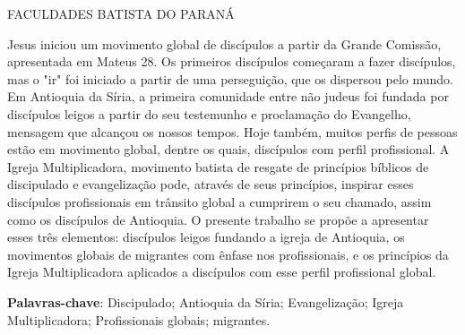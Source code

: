 \documentclass[12pt,openright,oneside,a4paper,
english,french,spanish,brazil]{abntex2}
\renewcommand{\imprimircapa}{%
  \begin{capa}%
    \center
    \ABNTEXchapterfont\Large FACULDADES BATISTA DO PARANÁ

    \vspace*{1,5cm}
    \MakeUppercase{{\ABNTEXchapterfont\large\imprimirautor}}
    \vfill
    \begin{center}
	\MakeUppercase{\ABNTEXchapterfont\bfseries\large\imprimirtitulo}
    \end{center}
    \vfill
    \large\imprimirlocal

    \large\imprimirdata
    \vspace*{1cm}
  \end{capa}
}
\begin{document}
 

\imprimircapa 
\imprimirfolhaderosto 

\begin{resumo} 
	Jesus iniciou um movimento global de discípulos a partir da Grande Comissão, apresentada em Mateus 28. Os primeiros discípulos começaram a fazer discípulos, mas o "ir" foi iniciado a partir de uma perseguição, que os dispersou pelo mundo. Em Antioquia da Síria, a primeira comunidade entre não judeus foi fundada por discípulos leigos a partir do seu testemunho e proclamação do Evangelho, mensagem que alcançou os nossos tempos. Hoje também, muitos perfis de pessoas estão em movimento global, dentre os quais, discípulos com perfil profissional. A Igreja Multiplicadora, movimento batista de resgate de princípios bíblicos de discipulado e evangelização pode, através de seus princípios, inspirar esses discípulos profissionais em trânsito global a cumprirem o seu chamado, assim como os discípulos de Antioquia. O presente trabalho se propõe a apresentar esses três elementos: discípulos leigos fundando a igreja de Antioquia, os movimentos globais de migrantes com ênfase nos profissionais, e os princípios da Igreja Multiplicadora aplicados a discípulos com esse perfil profissional global.

\vspace{\onelineskip} 
\noindent 
\textbf{Palavras-chave}: Discipulado; Antioquia da Síria; Evangelização; Igreja Multiplicadora; Profissionais globais; migrantes.
\end{resumo} 
\end{document}
